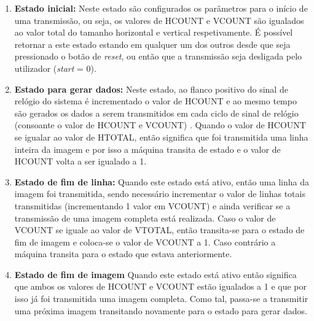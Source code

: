 \begin{enumerate}
	\item \textbf{Estado inicial:} Neste estado são configurados os parâmetros para o início de uma transmissão, ou seja, os valores de HCOUNT e VCOUNT são igualados ao valor total do tamanho horizontal e vertical respetivamente. É possível retornar a este estado estando em qualquer um dos outros desde que seja pressionado o botão  de \textit{reset}, ou então que a transmissão seja desligada pelo utilizador (\textit{start} = 0).
	
	\item \textbf{Estado para gerar dados:} Neste estado, ao flanco positivo do sinal de relógio do sistema é incrementado o valor de HCOUNT e ao mesmo tempo são gerados os dados a serem transmitidos em cada ciclo de sinal de relógio (consoante o valor de HCOUNT e VCOUNT) . Quando o valor de HCOUNT se igualar ao valor de HTOTAL, então significa que foi transmitida uma linha inteira da imagem e por isso a máquina transita de estado e o valor de HCOUNT volta a ser igualado a 1.
	
	\item \textbf{Estado de fim de linha:} Quando este estado está ativo, então uma linha da imagem foi transmitida, sendo necessário incrementar o valor de linhas totais transmitidas (incrementando 1 valor em VCOUNT) e ainda verificar se a transmissão de uma imagem completa está realizada. Caso o valor de VCOUNT se iguale ao valor de VTOTAL, então transita-se para o estado de fim de imagem e coloca-se o valor de VCOUNT a 1. Caso contrário a máquina transita para o estado que estava anteriormente.
	
	\item \textbf{Estado de fim de imagem} Quando este estado está ativo então significa que ambos os valores de HCOUNT e VCOUNT estão igualados a 1 e que por isso já foi transmitida uma imagem completa. Como tal, passa-se a transmitir uma próxima imagem transitando novamente para o estado para gerar dados.
	
\end{enumerate}

